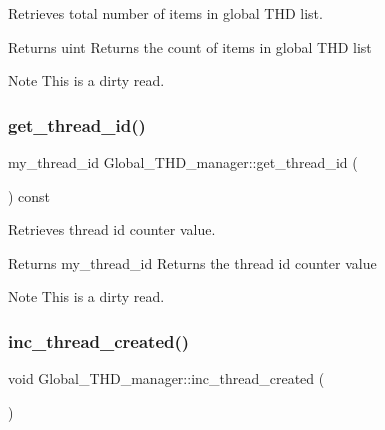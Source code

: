 Retrieves total number of items in global T\+HD list. \begin{DoxyReturn}{Returns}
uint Returns the count of items in global T\+HD list 
\end{DoxyReturn}
\begin{DoxyNote}{Note}
This is a dirty read. 
\end{DoxyNote}
\mbox{\label{classGlobal__THD__manager_a408b397cddb0f8b17108bd48e7b15464}} 
\subsubsection{\texorpdfstring{get\+\_\+thread\+\_\+id()}{get\_thread\_id()}}
{\footnotesize\ttfamily my\+\_\+thread\+\_\+id Global\+\_\+\+T\+H\+D\+\_\+manager\+::get\+\_\+thread\+\_\+id (\begin{DoxyParamCaption}{ }\end{DoxyParamCaption}) const\hspace{0.3cm}{\ttfamily [inline]}}

Retrieves thread id counter value. \begin{DoxyReturn}{Returns}
my\+\_\+thread\+\_\+id Returns the thread id counter value 
\end{DoxyReturn}
\begin{DoxyNote}{Note}
This is a dirty read. 
\end{DoxyNote}
\mbox{\label{classGlobal__THD__manager_ad3b390bc64900597e7f71800b7b72a45}} 
\subsubsection{\texorpdfstring{inc\+\_\+thread\+\_\+created()}{inc\_thread\_created()}}
{\footnotesize\ttfamily void Global\+\_\+\+T\+H\+D\+\_\+manager\+::inc\+\_\+thread\+\_\+created (\begin{DoxyParamCaption}{ }\end{DoxyParamCaption})\hspace{0.3cm}{\ttfamily [inline]}}

